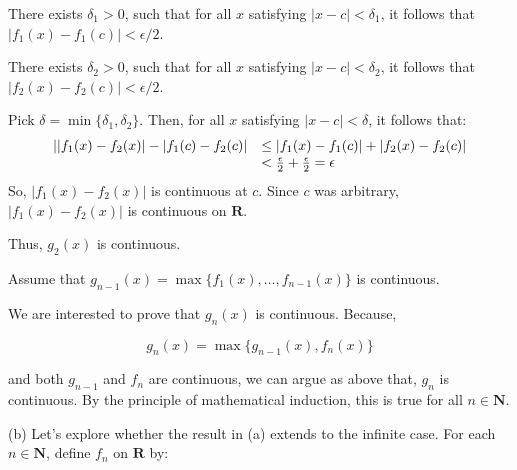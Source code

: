 \documentclass[10pt]{article}
\begin{document}
There exists $\displaystyle \delta _{1}  >0$, such that for all $\displaystyle x$ satisfying $\displaystyle |x-c|< \delta _{1}$, it follows that $\displaystyle |f_{1}( x) -f_{1}( c) |< \epsilon /2$.



There exists $\displaystyle \delta _{2}  >0$, such that for all $\displaystyle x$ satisfying $\displaystyle |x-c|< \delta _{2}$, it follows that $\displaystyle |f_{2}( x) -f_{2}( c) |< \epsilon /2$.



Pick $\displaystyle \delta =\min\{\delta _{1} ,\delta _{2}\}$. Then, for all $\displaystyle x$ satisfying $\displaystyle |x-c|< \delta $, it follows that:
\begin{equation*}
\begin{array}{ r l }
||f_{1}( x) -f_{2}( x) |-|f_{1}( c) -f_{2}( c) | & \leq |f_{1}( x) -f_{1}( c) |+|f_{2}( x) -f_{2}( c) |\\
 & < \frac{\epsilon }{2} +\frac{\epsilon }{2} =\epsilon 
\end{array}
\end{equation*}
So, $\displaystyle |f_{1}( x) -f_{2}( x) |$ is continuous at $\displaystyle c$. Since $\displaystyle c$ was arbitrary, $\displaystyle |f_{1}( x) -f_{2}( x) |$ is continuous on $\displaystyle \mathbf{R}$.



Thus, $\displaystyle g_{2}( x)$ is continuous.



Assume that $\displaystyle g_{n-1}( x) =\max\{f_{1}( x) ,\dotsc ,f_{n-1}( x)\}$ is continuous. 



We are interested to prove that $\displaystyle g_{n}( x)$ is continuous. Because,


\begin{equation*}
g_{n}( x) =\max\{g_{n-1}( x) ,f_{n}( x)\}
\end{equation*}


and both $\displaystyle g_{n-1}$ and $\displaystyle f_{n}$ are continuous, we can argue as above that, $\displaystyle g_{n}$ is continuous. By the principle of mathematical induction, this is true for all $\displaystyle n\in \mathbf{N}$.



(b) Let's explore whether the result in (a) extends to the infinite case. For each $\displaystyle n\in \mathbf{N}$, define $\displaystyle f_{n}$ on $\displaystyle \mathbf{R}$ by:
\end{document}
